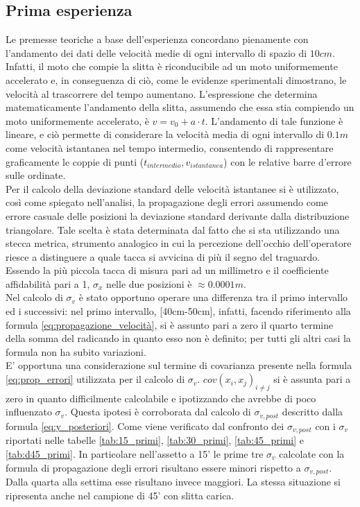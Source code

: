 \documentclass[a4paper,11pt,oneside]{article}
\begin{document}
\subsection{Prima esperienza}
Le premesse teoriche a base dell'esperienza concordano pienamente con l'andamento dei dati delle velocità medie di ogni intervallo di spazio di $10\si{cm}$. Infatti, il moto che compie la slitta è riconducibile ad un moto uniformemente accelerato e, in conseguenza di ciò, come le evidenze sperimentali dimostrano, le velocità al trascorrere del tempo aumentano. L'espressione che determina matematicamente l'andamento della slitta, assumendo che essa stia compiendo un moto uniformemente accelerato, è $v=v_{0}+a\cdot t$. L'andamento di tale funzione è lineare, e ciò permette di considerare la velocità media di ogni intervallo di $0.1\si{m}$ come velocità istantanea nel tempo intermedio, consentendo di rappresentare graficamente le coppie di punti ($t_{intermedio}, v_{istantanea}$) con le relative barre d'errore sulle ordinate.\\
Per il calcolo della deviazione standard delle velocità istantanee si è utilizzato, così come spiegato nell'analisi, la propagazione degli errori assumendo come errore casuale delle posizioni la deviazione standard derivante dalla distribuzione triangolare. Tale scelta è stata determinata dal fatto che si sta utilizzando una stecca metrica, strumento analogico in cui la percezione dell'occhio dell'operatore riesce a distinguere a quale tacca si avvicina di più il segno del traguardo. Essendo la più piccola tacca di misura pari ad un millimetro e il coefficiente affidabilità pari a 1, $\sigma_x$ nelle due posizioni è $\approx0.0001\si{m}$.\\
Nel calcolo di $\sigma_v$ è stato opportuno operare una differenza tra il primo intervallo ed i successivi: nel primo intervallo, [40cm-50cm], infatti, facendo riferimento alla formula \ref{eq:propagazione_velocità}, si è assunto pari a zero il quarto termine della somma del radicando in quanto esso non è definito; per tutti gli altri casi la formula non ha subito variazioni.\\
E' opportuna una considerazione sul termine di covarianza presente nella formula \ref{eq:prop_errori} utilizzata per il calcolo di $\sigma_v$. $cov(x_{i},x_{j})_{i \neq j}$  si è assunta pari a zero in quanto difficilmente calcolabile e ipotizzando che avrebbe di poco influenzato $\sigma_{v}$. Questa ipotesi è corroborata dal calcolo di $\sigma_{v, post}$ descritto dalla formula \ref{eq:y_posteriori}. Come viene verificato dal confronto dei $\sigma_{v, post}$ con i $\sigma_{v}$ riportati nelle tabelle \ref{tab:15_primi}, \ref{tab:30_primi}, \ref{tab:45_primi} e \ref{tab:d45_primi}. In particolare nell'assetto a 15' le prime tre $\sigma_{v}$ calcolate con la formula di propagazione degli errori risultano essere minori rispetto a $\sigma_{v, post}$. Dalla quarta alla settima esse risultano invece maggiori. La stessa situazione si ripresenta anche nel campione di 45' con slitta carica.
\end{document}
